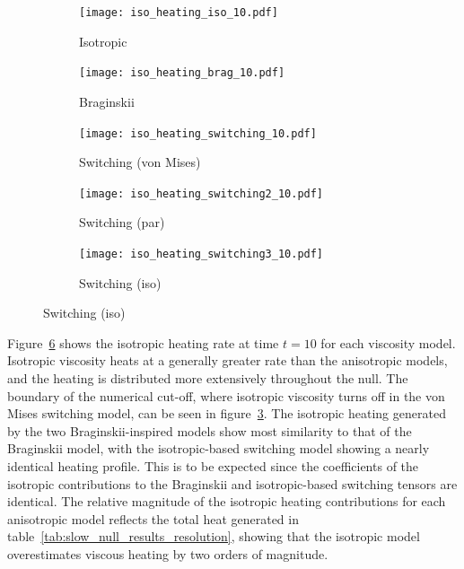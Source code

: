 \begin{figure}[t]
    \centering
    \hfill
    \begin{subfigure}{0.32\textwidth}
      \texttt{[image: iso\_heating\_iso\_10.pdf]}
      \caption{Isotropic}%
      \label{fig:iso_heating_iso_10}
    \end{subfigure}
    \hfill
    \begin{subfigure}{0.32\textwidth}
      \texttt{[image: iso\_heating\_brag\_10.pdf]}
      \caption{Braginskii}%
      \label{fig:iso_heating_brag_10}
    \end{subfigure}
    \hfill
    \begin{subfigure}{0.32\textwidth}
      \texttt{[image: iso\_heating\_switching\_10.pdf]}
      \caption{Switching (von Mises)}%
      \label{fig:iso_heating_switching_10}
    \end{subfigure}
    \begin{subfigure}{0.32\textwidth}
      \texttt{[image: iso\_heating\_switching2\_10.pdf]}
      \caption{Switching (par)}%
      \label{fig:iso_heating_switching2_10}
    \end{subfigure}
    \begin{subfigure}{0.32\textwidth}
      \texttt{[image: iso\_heating\_switching3\_10.pdf]}
      \caption{Switching (iso)}%
      \label{fig:iso_heating_switching3_10}
    \end{subfigure}

\label{fig:isotropic_heating}%
\end{figure}

Figure~\ref{fig:isotropic_heating} shows the isotropic heating rate at time $t=10$ for each viscosity model. Isotropic viscosity heats at a generally greater rate than the anisotropic models, and the heating is distributed more extensively throughout the null. The boundary of the numerical cut-off, where isotropic viscosity turns off in the von Mises switching model, can be seen in figure~\ref{fig:iso_heating_switching_10}. The isotropic heating generated by the two Braginskii-inspired models show most similarity to that of the Braginskii model, with the isotropic-based switching model showing a nearly identical heating profile. This is to be expected since the coefficients of the isotropic contributions to the Braginskii and isotropic-based switching tensors are identical. The relative magnitude of the isotropic heating contributions for each anisotropic model reflects the total heat generated in table~\ref{tab:slow_null_results_resolution}, showing that the isotropic model overestimates viscous heating by two orders of magnitude.

